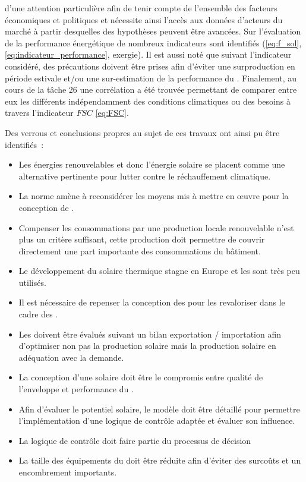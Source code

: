 d’une attention particulière afin de tenir compte de
l’ensemble des facteurs économiques et politiques et nécessite ainsi l’accès aux données
d’acteurs du marché à partir desquelles des hypothèses peuvent être avancées. Sur
l’évaluation de la performance énergétique de nombreux indicateurs sont identifiés
(\eqref{eq:f_sol}, \eqref{eq:indicateur_performance}, exergie). Il est aussi noté que
suivant l’indicateur considéré, des précautions doivent être prises afin d’éviter une
surproduction en période estivale et/ou une sur-estimation de la performance du .
Finalement, au cours de la tâche $26$ une corrélation a
été trouvée permettant de comparer entre eux les différents  indépendamment des
conditions climatiques ou des besoins à travers l’indicateur $FSC$ \eqref{eq:FSC}.

Des verrous et conclusions propres au sujet de ces travaux ont ainsi pu être identifiés~:
\begin{itemize}
  \item Les énergies renouvelables et donc l’énergie solaire se placent comme une
        alternative pertinente pour lutter contre le réchauffement climatique.
  \item La norme  amène à reconsidérer les moyens mis à mettre
        en œuvre pour la conception de .
  \item Compenser les consommations par une production locale renouvelable n’est plus un critère
        suffisant, cette production doit permettre de couvrir directement une part
        importante des consommations du bâtiment.
  \item Le développement du solaire thermique stagne en Europe et les 
        sont très peu utilisés.
  \item Il est nécessaire de repenser la conception des  pour les revaloriser
        dans le cadre des .
  \item Les  doivent être évalués suivant un bilan exportation / importation
        afin d’optimiser non pas la production solaire mais la production solaire
        en adéquation avec la demande.
  \item La conception d’une  solaire doit être le compromis entre qualité
        de l’enveloppe et performance du .
  \item Afin d’évaluer le potentiel solaire, le modèle doit être détaillé pour
        permettre l’implémentation d’une logique de contrôle adaptée et évaluer
        son influence.
  \item La logique de contrôle doit faire partie du processus de décision
  \item La taille des équipements du  doit être réduite afin d’éviter des
        surcoûts et un encombrement importants.
\end{itemize}




